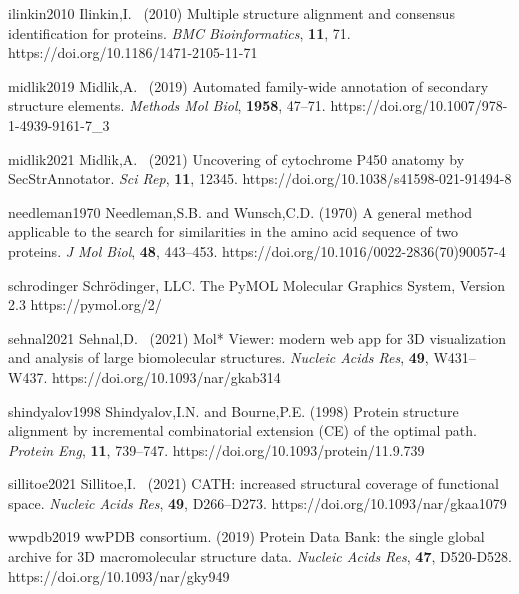 \documentclass{article}
\begin{document}
\myreference
{ilinkin2010}
{Ilinkin,I. \etal\ (2010) 
Multiple structure alignment and consensus identification for proteins. 
\emph{BMC Bioinformatics}, \textbf{11}, 71.}
{https://doi.org/10.1186/1471-2105-11-71}

\myreference
{midlik2019}
{Midlik,A. \etal\ (2019) 
Automated family-wide annotation of secondary structure elements. 
\emph{Methods Mol Biol}, \textbf{1958}, 47--71.}
{https://doi.org/10.1007/978-1-4939-9161-7_3}

\myreference
{midlik2021}
{Midlik,A. \etal\ (2021) 
Uncovering of cytochrome P450 anatomy by SecStrAnnotator. 
\emph{Sci Rep}, \textbf{11}, 12345.}
{https://doi.org/10.1038/s41598-021-91494-8}

\myreference
{needleman1970}
{Needleman,S.B. and Wunsch,C.D. (1970)
A general method applicable to the search for similarities in the amino acid sequence of two proteins.
\emph{J Mol Biol}, \textbf{48}, 443--453.}
{https://doi.org/10.1016/0022-2836(70)90057-4}

\myreference
{schrodinger}
{Schrödinger, LLC. The PyMOL Molecular Graphics System, Version 2.3}
{https://pymol.org/2/}

\myreference
{sehnal2021}
{Sehnal,D. \etal\ (2021)
Mol* Viewer: modern web app for 3D visualization and analysis of large biomolecular structures. 
\emph{Nucleic Acids Res}, \textbf{49}, W431--W437.}
{https://doi.org/10.1093/nar/gkab314}

\myreference
{shindyalov1998}
{Shindyalov,I.N. and Bourne,P.E. (1998) 
Protein structure alignment by incremental combinatorial extension (CE) of the optimal path. 
\emph{Protein Eng}, \textbf{11}, 739--747.}
{https://doi.org/10.1093/protein/11.9.739}

\myreference
{sillitoe2021}
{Sillitoe,I. \etal\ (2021) 
CATH: increased structural coverage of functional space. 
\emph{Nucleic Acids Res}, \textbf{49}, D266--D273.}
{https://doi.org/10.1093/nar/gkaa1079}

\myreference
{wwpdb2019}
{wwPDB consortium. (2019) 
Protein Data Bank: the single global archive for 3D macromolecular structure data. 
\emph{Nucleic Acids Res}, \textbf{47}, D520-D528.}
{https://doi.org/10.1093/nar/gky949}
\end{document}
